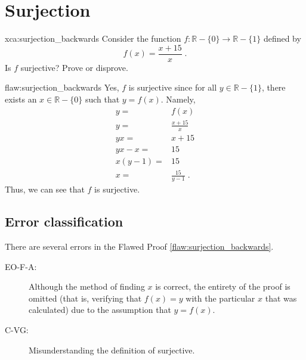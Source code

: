 \section{Surjection}

\begin{xca}{xca:surjection_backwards}
Consider the function $f: \mathbb{R}- \{0\} \rightarrow \mathbb{R}-\{1\}$ defined by 
$$f(x) = \frac{x + 15}{x}\;.$$
Is $f$ surjective? Prove or disprove.
\end{xca}

\begin{flaw}{flaw:surjection_backwards} %
Yes, $f$ is surjective since for all $y \in \mathbb{R}-\{1\}$, there exists an $x \in \mathbb{R}-\{0\}$ such that $y=f(x).$ Namely, 
\begin{align*}
    y =& f(x) \\
    y =& \frac{x+15}{x} \\
    yx =& x+15 \\
    yx - x =& 15 \\
    x(y-1) =& 15 \\
    x =& \frac{15}{y-1}\;.
\end{align*}
Thus, we can see that $f$ is surjective.
\end{flaw}

\clearpage
\subsection{Error classification}


There are several errors
 in the Flawed Proof \ref{flaw:surjection_backwards}. %

 
 \begin{description}
    \item[EO-F-A: ] Although the method of finding $x$ is correct, the entirety of the proof is omitted (that is, verifying that $f(x)=y$ with the particular $x$ that was calculated) due to the assumption that $y=f(x)$. 
 	\item[C-VG: ] Misunderstanding the definition of surjective. 
 \end{description}

